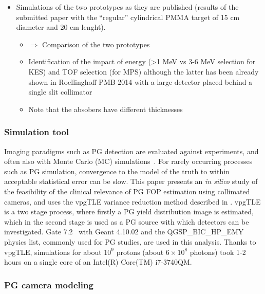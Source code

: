 \documentclass[a4paper,english]{article}
\begin{document}
\begin{itemize}
  \item Simulations of the two prototypes as they are published (results of the submitted paper with the \enquote{regular} cylindrical PMMA target of 15 cm diameter and 20 cm lenght). 
  \begin{itemize}
    \item $\Rightarrow$ Comparison of the two prototypes
    \item Identification of the impact of energy (>1 MeV vs 3-6 MeV selection for KES) and TOF selection (for MPS) although the latter has been already shown in Roellinghoff PMB 2014 with a large detector placed behind a single slit collimator
    \item Note that the absobers have different thicknesses
  \end{itemize}     
\end{itemize}

\subsubsection{Simulation tool}

Imaging paradigms such as PG detection are evaluated against experiments, and often also with Monte Carlo (MC) simulations~\citep{Moteabbed2011,Gueth2013,Robert2013,Golnik2014a,Janssen2014}. For rarely occurring processes such as PG simulation, convergence to the model of the truth to within acceptable statistical error can be slow. This paper presents an \emph{in silico} study of the feasibility of the clinical relevance of PG FOP estimation using collimated cameras, and uses the vpgTLE variance reduction method described in \cite{Huisman2016}. vpgTLE is a two stage process, where firstly a PG yield distribution image is estimated, which in the second stage is used as a PG source with which detectors can be investigated. Gate 7.2~\citep{Sarrut2014} with Geant 4.10.02 and the QGSP\_BIC\_HP\_EMY physics list, commonly used for PG studies, are used in this analysis. Thanks to vpgTLE, simulations for about $10^9$ protons (about $6\times10^8$ photons) took 1-2 hours on a single core of an Intel(R) Core(TM) i7-3740QM.

\subsubsection{PG camera modeling}\label{sec:camera}
\end{document}
